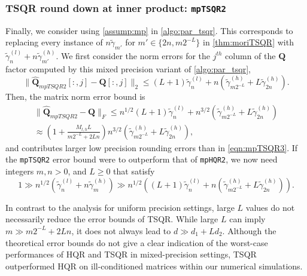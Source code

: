 \documentclass[review,onefignum,onetabnum]{siamart190516}
\newcommand{\bb}[1]{\mathbf{#1}}
\begin{document}
\subsubsection{TSQR round down at inner product: {\tt mpTSQR2}}
Finally, we consider using \cref{assump:mp} in \cref{algo:par_tsqr}.
This corresponds to replacing every instance of $n\tilde{\gamma}_{m'}$ for $m'\in\{2n, m2^{-L}\}$ in \cref{thm:moriTSQR} with $\tilde{\gamma}_n^{(l)} + n\tilde{\gamma}_{m'}^{(h)}$.
We first consider the norm errors for the $j^{th}$ column of the $\bb{Q}$ factor computed by this mixed precision variant of \cref{algo:par_tsqr},
\begin{equation}
\|\hat{\bb{Q}}_{mpTSQR2}[:,j] -\bb{Q}[:,j]\|_2 \leq (L+1)\tilde{\gamma}_n^{(l)} +n(\tilde{\gamma}_{m2^{-L}}^{(h)} + L\tilde{\gamma}_{ 2n}^{(h)}).\label{eqn:mptsqr2Qcol}
\end{equation} 
Then, the matrix norm error bound is 
\begin{align}
\|\hat{\bb{Q}}_{mpTSQR2}-\bb{Q}\|_F \leq n^{1/2}(L+1)\tilde{\gamma}_n^{(l)} +n^{3/2}(\tilde{\gamma}_{m2^{-L}}^{(h)} + L\tilde{\gamma}_{ 2n}^{(h)})\\
\approx \left(1+ \frac{M_{l,h}L}{m2^{-L}+ 2Ln}\right)n^{3/2}(\tilde{\gamma}_{m2^{-L}}^{(h)} + L\tilde{\gamma}_{ 2n}^{(h)}),\label{eqn:mptsqr2Q}
\end{align}
and contributes larger low precision rounding errors than in \cref{eqn:mpTSQR3}.
If the {\tt mpTSQR2} error bound were to outperform that of {\tt mpHQR2}, we now need integers $m, n > 0$, and $L\geq 0$ that satisfy
\begin{equation*}
1\gg n^{1/2}\left(\tilde{\gamma}_{n}^{(l)} + n\tilde{\gamma}_{m}^{(h)}\right) \gg n^{1/2}\left((L+1)\tilde{\gamma}_n^{(l)} +n(\tilde{\gamma}_{m2^{-L}}^{(h)} + L\tilde{\gamma}_{ 2n}^{(h)})\right).%
\end{equation*}

In contrast to the analysis for uniform precision settings, large $L$ values do not necessarily reduce the error bounds of TSQR. 
While large $L$ can imply $m\gg m2^{-L}+2Ln$, it does not always lead to $d \gg d_1+Ld_2$.
Although the theoretical error bounds do not give a clear indication of the worst-case performances of HQR and TSQR in mixed-precision settings, TSQR outperformed HQR on ill-conditioned matrices within our numerical simulations.
\end{document}

